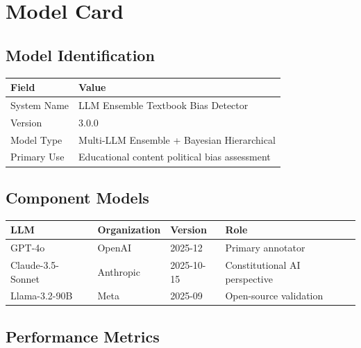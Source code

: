 \documentclass[10pt,letterpaper]{article}
\begin{document}
\section{Model Card}
\label{app:model_card}

\subsection*{Model Identification}

\begin{table}[h]
\centering
\begin{tabular}{ll}
\toprule
\textbf{Field} & \textbf{Value} \\
\midrule
System Name   & LLM Ensemble Textbook Bias Detector \\
Version       & 3.0.0 \\
Model Type    & Multi-LLM Ensemble + Bayesian Hierarchical \\
Primary Use   & Educational content political bias assessment \\
\bottomrule
\end{tabular}
\end{table}

\subsection*{Component Models}

\begin{table}[h]
\centering
\begin{tabular}{llll}
\toprule
\textbf{LLM} & \textbf{Organization} & \textbf{Version} & \textbf{Role} \\
\midrule
GPT-4o            & OpenAI    & 2025-12    & Primary annotator \\
Claude-3.5-Sonnet & Anthropic & 2025-10-15 & Constitutional AI perspective \\
Llama-3.2-90B     & Meta      & 2025-09    & Open-source validation \\
\bottomrule
\end{tabular}
\end{table}

\subsection*{Performance Metrics}
\end{document}
